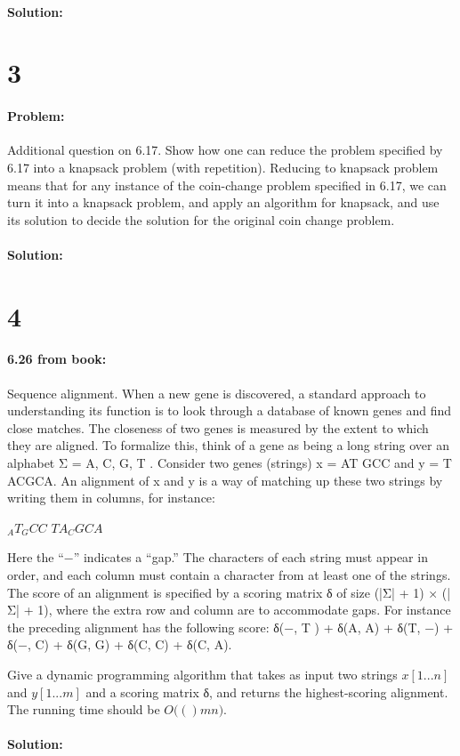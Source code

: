 \documentclass[12pt]{article}
\newcommand{\BigO}[1]{\ensuremath{O(#1)}}
\begin{document}
\paragraph{Solution:}


\section*{3}
\paragraph{Problem:}
Additional question on 6.17. Show how one can reduce the problem specified by
6.17 into a knapsack problem (with repetition). Reducing to knapsack problem
means that for any instance of the coin-change problem specified in 6.17, we
can turn it into a knapsack problem, and apply an algorithm for knapsack, and
use its solution to decide the solution for the original coin change problem.
\paragraph{Solution:}

\section*{4}
\paragraph{6.26 from book:}
Sequence alignment. When a new gene is discovered, a standard approach to
understanding its function is to look through a database of known genes and
find close matches. The closeness of two genes is measured by the extent to 
which they are aligned. To formalize this, think of a gene as being a long
string over an alphabet Σ = {A, C, G, T }. Consider two genes (strings)
x = AT GCC and y = T ACGCA. An alignment of x and y is a way of matching up
these two strings by writing them in columns, for instance:

$_AT_GCC$
$TA_CGCA$

Here the “−” indicates a “gap.” The characters of each string must appear
in order, and each column must contain a character from at least one of 
the strings. The score of an alignment is specified by a scoring matrix δ
of size (|Σ| + 1) × (|Σ| + 1), where the extra row and column are to
accommodate gaps. For instance the preceding alignment has the following score:
δ(−, T ) + δ(A, A) + δ(T, −) + δ(−, C) + δ(G, G) + δ(C, C) + δ(C, A).

Give a dynamic programming algorithm that takes as input two strings $x[1 . . . n]$ and $y[1 . . . m]$ and a scoring matrix δ, and returns the highest-scoring alignment. The running time should be $\BigO(mn)$.

\paragraph{Solution:}
\end{document}
